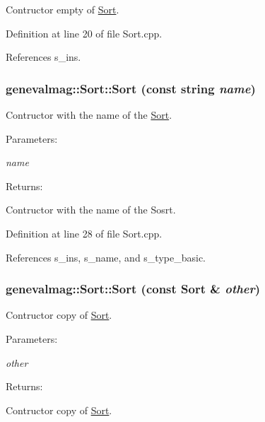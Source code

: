 Contructor empty of \hyperlink{classgenevalmag_1_1Sort}{Sort}. 

Definition at line 20 of file Sort.cpp.

References s\_\-ins.\hypertarget{classgenevalmag_1_1Sort_741ce3c7c95b313f4a7d04588d2f32ec}{
\subsubsection[{Sort}]{\setlength{\rightskip}{0pt plus 5cm}genevalmag::Sort::Sort (const string {\em name})}}
\label{classgenevalmag_1_1Sort_741ce3c7c95b313f4a7d04588d2f32ec}


Contructor with the name of the \hyperlink{classgenevalmag_1_1Sort}{Sort}. \begin{Desc}
\item[Parameters:]
\begin{description}
\item[{\em name}]\end{description}
\end{Desc}
\begin{Desc}
\item[Returns:]\end{Desc}
Contructor with the name of the Sosrt. 

Definition at line 28 of file Sort.cpp.

References s\_\-ins, s\_\-name, and s\_\-type\_\-basic.\hypertarget{classgenevalmag_1_1Sort_b2cce40fbf624c23b0371c3a7f931ac4}{
\subsubsection[{Sort}]{\setlength{\rightskip}{0pt plus 5cm}genevalmag::Sort::Sort (const {\bf Sort} \& {\em other})}}
\label{classgenevalmag_1_1Sort_b2cce40fbf624c23b0371c3a7f931ac4}


Contructor copy of \hyperlink{classgenevalmag_1_1Sort}{Sort}. \begin{Desc}
\item[Parameters:]
\begin{description}
\item[{\em other}]\end{description}
\end{Desc}
\begin{Desc}
\item[Returns:]\end{Desc}
Contructor copy of \hyperlink{classgenevalmag_1_1Sort}{Sort}. 


